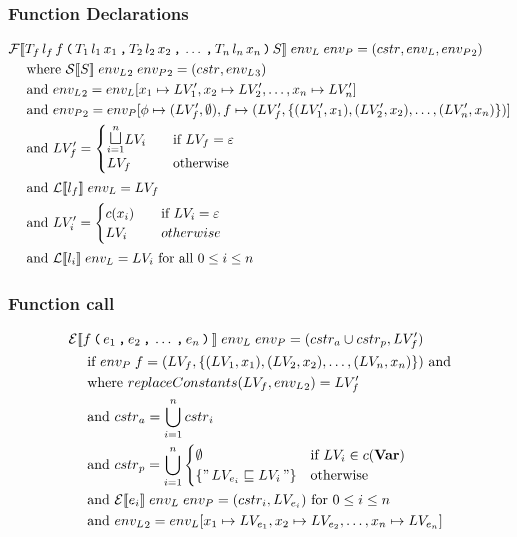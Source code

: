 \subsubsection{Function Declarations}
\begin{align*}
& \iF\dblSq{T_f \, l_f \, f \tk ( T_1 \, l_1 \, x_1 \tk , T_2 \, l_2 \, x_2 \tk , \dots \tk , T_n \, l_n \, x_n \tk ) S} \; \ienvL \; \ienvP
  =  (\icstr, \ienvL, \ienvP_2) \\
& \dsWhere{\iS\dblSq{S} \; \ienvL_2 \; \ienvP_2 = (\icstr, \ienvL_3)} \\
& \dsAnd{\ienvL_2 = \ienvL[x_1 \mapsto \iLV_1', x_2 \mapsto \iLV_2', \dots, x_n \mapsto \iLV_n']} \\
& \dsAnd{\ienvP_2 = \ienvP[\ifb \mapsto (\iLV_f', \emptyset), f \mapsto (\iLV_f', \{(\iLV_1', x_1), (\iLV_2', x_2), \dots, (\iLV_n', x_n)\})]} \\
& \dsAnd{\iLV_f' = \begin{cases}
    \mathlarger\sqcupl_{i = 1}^n \iLV_i & \quad \text{if } \iLV_f = \varepsilon \\
    \iLV_f & \quad \text{otherwise}
  \end{cases}} \\
& \dsAnd{\iL\dblSq{l_f} \; \ienvL = \iLV_f} \\
& \dsAnd{\iLV_i' = \begin{cases}
    c(x_i) & \quad \text{if } \iLV_i = \varepsilon \\
    \iLV_i & \quad otherwise
  \end{cases}} \\
& \dsAnd{\iL\dblSq{l_i} \; \ienvL = \iLV_i \text{ for all } 0 \leq i \leq n}
\end{align*}

\subsubsection{Function call}
\begin{align*}
& \mathcal{E}[\![ f \, \texttt{(} \, e_1 \, \texttt{,} \, e_2 \, \texttt{,} \, \dots \, \texttt{,} \, e_n \, \texttt{)} \, ]\!] \; {env_L} \; {env_P} = (cstr_a \cup cstr_p, LV_f') \\
& \quad \text{ if } {env_P} \; f = (LV_f, \{(LV_1, x_1), (LV_2, x_2), \dots, (LV_n, x_n)\}) \text{ and} \\
& \quad \text{ where } replaceConstants(LV_f, {env_L}_2) = LV_f' \\
& \quad \text{ and } {cstr}_a = \bigcup\limits_{i=1}^n {cstr}_i \\
& \quad \text{ and } {cstr}_p = \bigcup\limits_{i=1}^n
  \begin{cases}
    \emptyset &\text{if } LV_i \in c(\mathbf{Var})\\
    \{ "\,LV_{e_i} \sqsubseteq LV_i\," \} & \text{otherwise}
  \end{cases} \\
& \quad \text{ and } \mathcal{E}[\![ e_i ]\!] \; {env_L} \; {env_P} = (cstr_i, LV_{e_i}) \text{ for } 0 \leq i \leq n \\
& \quad \text{ and } {env_L}_2 = {env_L}[x_1 \mapsto LV_{e_1}, x_2 \mapsto LV_{e_2}, \dots, x_n \mapsto LV_{e_n}]
\end{align*}
